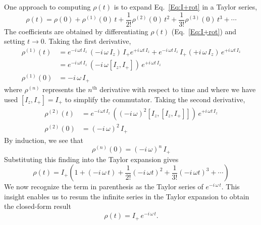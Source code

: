 One approach to computing $\rho(t)$ is to expand Eq.~\ref{Eq:I+rot} in a Taylor series,
\begin{equation}
\rho(t) 
	= \rho(0) + \rho^{(1)}(0) \, t + \frac{1}{2!} \rho^{(2)}(0) \, t^2
 		+ \frac{1}{3!} \rho^{(3)}(0) \, t^3 + \cdots
\end{equation}
The coefficients are obtained by differentiating $\rho(t)$ (Eq.~\ref{Eq:I+rot}) and setting $t \rightarrow 0$.  Taking the first derivative,
\begin{subequations}
\begin{align}
\rho^{(1)}(t) 
	& = e^{-i \, \omega t \, I_z} \,
		(-i \, \omega \, I_z) \, I_{+} 
		e^{+i \, \omega t \, I_z}
	 + e^{-i \, \omega t \, I_z} \,
		 I_{+} (+i \, \omega \, I_z) \, 
		e^{+i \, \omega t \, I_z} \\
	& = e^{-i \, \omega t \, I_z} \, 
		(-i \, \omega [I_z,I_{+}] ) 
		\, e^{+i \, \omega t \, I_z} \\
\rho^{(1)}(0) & = -i \, \omega \, I_{+}
\end{align}
\end{subequations}
where $\rho^{(n)}$ represents the $n^{\text{th}}$ derivative with respect to time and where we have used $[I_z,I_{+}] = I_{+}$ to simplify the commutator.  Taking the second derivative,
\begin{subequations}
\begin{align}
\rho^{(2)}(t) & = e^{-i \, \omega t \, I_z} \, 
	((-i \, \omega)^2 [I_z,[I_z,I_{+}]] ) 
	\, e^{+i \, \omega t \, I_z} \\
\rho^{(2)}(0) & = (-i \, \omega)^2 \, I_{+} 
\end{align}
\end{subequations}
By induction, we see that
\begin{equation}
\rho^{(n)}(0) = (-i \, \omega)^n \, I_{+}
\end{equation}
Substituting this finding into the Taylor expansion gives
\begin{equation}
\rho(t) 
	= I_{+} \left( 1 
		+ (-i \, \omega \, t) 
		+ \frac{1}{2!} (-i \, \omega t)^2 
		+ \frac{1}{3!} (-i \, \omega t)^3
		+ \cdots
	\right)
\end{equation}
We now recognize the term in parenthesis as the Taylor series of $e^{-i \, \omega \, t}$.  This insight enables us to resum the infinite series in the Taylor expansion to obtain the closed-form result
\begin{equation}
\rho(t) 
	= I_{+} \, e^{-i \, \omega \, t}.
	\label{Eq:I+-soln-method-1}
\end{equation}   

